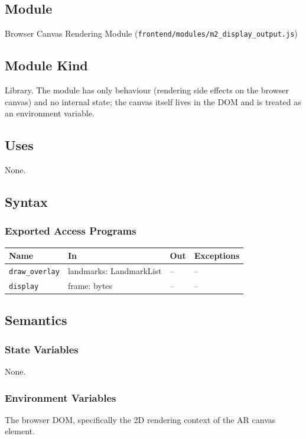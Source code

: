 \documentclass[12pt, titlepage]{article}
\begin{document}
\subsection{Module}
Browser Canvas Rendering Module (\texttt{frontend/modules/m2\_display\_output.js})

\subsection{Module Kind}
Library. The module has only behaviour (rendering side effects on the
browser canvas) and no internal state; the canvas itself lives in the
DOM and is treated as an environment variable.

\subsection{Uses}
None.

\subsection{Syntax}

\subsubsection{Exported Access Programs}

\begin{center}
\begin{tabular}{p{4.5cm} p{4.5cm} p{1.5cm} p{2cm}}
\hline
\textbf{Name} & \textbf{In} & \textbf{Out} & \textbf{Exceptions} \\
\hline
\texttt{draw\_overlay} & landmarks: LandmarkList & -- & -- \\
\texttt{display} & frame: bytes & -- & -- \\
\hline
\end{tabular}
\end{center}

\subsection{Semantics}

\subsubsection{State Variables}
None.

\subsubsection{Environment Variables}
The browser DOM, specifically the 2D rendering context of the AR
canvas element.
\end{document}
